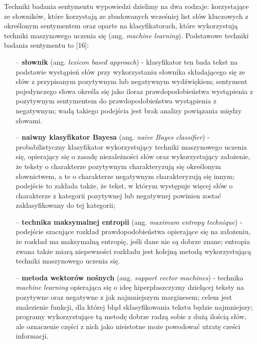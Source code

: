 Techniki badania sentymentu wypowiedzi dzielimy na dwa rodzaje: korzystające ze słowników, które korzystają ze zbudowanych wcześniej list słów kluczowych z określonym sentymentem oraz oparte na klasyfikatorach, które wykorzystują techniki maszynowego uczenia się (ang. \textit{machine learning}). Podstawowe techniki badania sentymentu to [16]:
\begin{itemize}
	\item[--] \textbf{słownik} (ang. \textit{lexicon based approach}) - klasyfikator ten bada tekst na podstawie wystąpień słów przy wykorzystaniu słownika składającego się ze słów z przypisanym pozytywnym lub negatywnym wydźwiękiem; sentyment pojedynczego słowa określa się jako iloraz prawdopodobieństwa wystąpienia z pozytywnym sentymentem do prawdopodobieństwa wystąpienia z negatywnym; wadą takiego podejścia jest brak analizy powiązania między słowami.
	\item[--] \textbf{naiwny klasyfikator Bayesa} (ang. \textit{naive Bayes classifier}) - probabilistyczny klasyfikator wykorzystujący techniki maszynowego uczenia się, opierający się o zasadę niezależności słów oraz wykorzystujący założenie, że teksty o charakterze pozytywnym charakteryzują się określonym słownictwem, a te o charakterze negatywnym charakteryzują się innym; podejście to zakłada także, że tekst, w którym występuje więcej słów o charakterze z kategorii pozytywnej lub negatywnej powinien zostać zaklasyfikowany do tej kategorii;
	\item[--] \textbf{technika maksymalnej entropii} (ang. \textit{maximum entropy technique}) - podejście szacujące rozkład prawdopodobieństwa opierające się na założeniu, że rozkład  ma maksymalną entropię, jeśli dane nie są dobrze znane; entropia zwana także miarą niepewności rozkładu jest kolejną metodą wykorzystującą techniki maszynowego uczenia się.
	\item[--] \textbf{metoda wektorów nośnych} (ang. \textit{support vector machines}) - technika \textit{machine learning} opierająca się o ideę hiperpłaszczyzny dzielącej teksty na pozytywne oraz negatywne z jak najmniejszym marginesem; celem jest znalezienie funkcji, dla której błąd sklasyfikowania tekstu będzie najmniejszy; programy wykorzystujące tą metodę dobrze radzą sobie z dużą ilością słów, ale oznaczenie części z nich jako nieistotne może powodować utratę cześci informacji.
\end{itemize}


